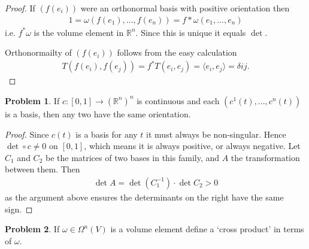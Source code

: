 \documentclass[20pt]{article}
\theoremstyle{plain}
\theoremstyle{definition}
\newtheorem*{problem}{Problem}
\newcommand{\reals}{\mathbb{R}}
\begin{document}
\begin{proof}
  If $(f(e_i))$ were an orthonormal basis with positive orientation then 
  \begin{align*}
    1 = \omega( f(e_1), ..., f(e_n) ) = f*\omega(e_1, ..., e_n)
  \end{align*}
  i.e. $f^*\omega$ is the volume element in $\reals^n$.  Since this is unique it equals $\det$.

  Orthonormailty of $(f(e_i))$ follows from the easy calculation
  \begin{align*}
    T(f(e_i), f(e_j)) = f^*T(e_i, e_j) = \langle e_i, e_j \rangle = \delta{ij}.
  \end{align*}
\end{proof}
















\begin{problem}{4.5}
    If $c: [0, 1] \to (\reals^n)^n$ is continuous and each $(c^1(t), ..., c^n(t))$ is a basis, 
    then any two have the same orientation. 
\end{problem}

\begin{proof}
  Since $c(t)$ is a basis for any $t$ it must always be non-singular.
  Hence $\det \circ c \neq 0$ on $[0, 1]$, which means it is always 
  positive, or always negative.
  Let $C_1$ and $C_2$ be the matrices of two bases in this family, and $A$ the transformation between them. 
  Then 
  \begin{align*}
    \det A = \det(C^{-1}_1) \cdot \det C_2 > 0
  \end{align*}
  as the argument above ensures the determinants on the right have the same sign.
\end{proof}










\begin{problem}{4.8}
  If $\omega \in \Omega^n(V)$ is a volume element define a `cross product' in terms of $\omega$.
\end{problem}
\end{document}
